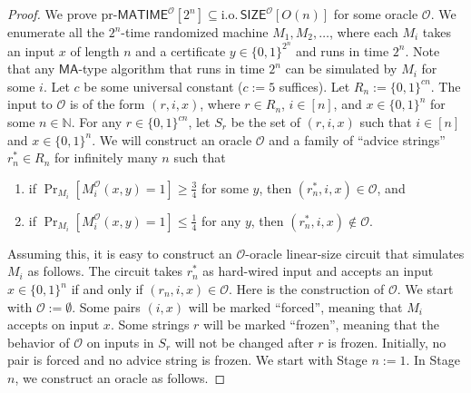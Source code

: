 \begin{proof}
We prove $\mathrm{pr}\text{-}\mathsf{MATIME}^{\mathcal O}[2^n]\subseteq\mathrm{i.o.}\,\mathsf{SIZE}^{\mathcal O}[O(n)]$ for some oracle $\mathcal O$. We enumerate all the $2^n$-time randomized machine $M_1,M_2,\ldots$, where each $M_i$ takes an input $x$ of length $n$ and a certificate $y\in\{0,1\}^{2^n}$ and runs in time $2^n$. Note that any $\mathsf{MA}$-type algorithm that runs in time $2^n$ can be simulated by $M_i$ for some $i$.
Let $c$ be some universal constant ($c:=5$ suffices). Let $R_n:=\{0,1\}^{cn}$. The input to $\mathcal O$ is of the form $(r,i,x)$, where $r\in R_n$, $i\in[n]$, and $x\in\{0,1\}^n$ for some $n\in\mathbb N$. For any $r\in\{0,1\}^{cn}$, let $S_r$ be the set of $(r,i,x)$ such that $i\in[n]$ and $x\in\{0,1\}^n$.
We will construct an oracle $\mathcal O$ and a family of ``advice strings'' $r_n^*\in R_n$ for infinitely many $n$ such that
\begin{enumerate}
\item if $\Pr_{M_i}[M_i^{\mathcal O}(x,y)=1]\geq\frac34$ for some $y$, then $(r_n^*,i,x)\in\mathcal O$, and
\item if $\Pr_{M_i}[M_i^{\mathcal O}(x,y)=1]\leq\frac14$ for any $y$, then $(r_n^*,i,x)\notin\mathcal O$.
\end{enumerate}
Assuming this, it is easy to construct an $\mathcal O$-oracle linear-size circuit that simulates $M_i$ as follows. The circuit takes $r_n^*$ as hard-wired input and accepts an input $x\in\{0,1\}^n$ if and only if $(r_n,i,x)\in\mathcal O$.
Here is the construction of $\mathcal O$. We start with $\mathcal O:=\emptyset$. Some pairs $(i,x)$ will be marked ``forced'', meaning that $M_i$ accepts on input $x$. Some strings $r$ will be marked ``frozen'', meaning that the behavior of $\mathcal O$ on inputs in $S_r$ will not be changed after $r$ is frozen. Initially, no pair is forced and no advice string is frozen. We start with Stage $n:=1$. In Stage $n$, we construct an oracle as follows.

\end{proof}
